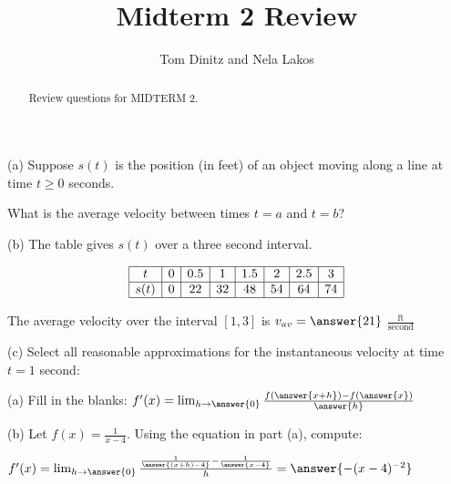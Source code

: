 \documentclass{ximera}
\author{Tom Dinitz and Nela Lakos}
\title{Midterm 2 Review}
\begin{document}
\begin{abstract}
Review questions for MIDTERM 2.
\end{abstract}
\maketitle

\begin{exercise}
(a) Suppose $s(t)$ is the position (in feet) of an object moving along a line at time $t\geq 0$ seconds. 

What is the average velocity between times $t=a$ and $t=b$?
\begin{prompt}
\begin{multipleChoice}
\end{multipleChoice}
\end{prompt}

(b) The table gives $s(t)$ over a three second interval.

\[
\begin{array}{|c|c|c|c|c|c|c|c|}
\hline
t& 0& 0.5& 1& 1.5& 2& 2.5& 3\\ \hline
s(t)& 0 & 22 & 32 & 48 & 54 & 64 & 74 \\ \hline
\end{array}
\]

The average velocity over the interval $[1,3]$ is $v_{av}=\answer{21}$ $\frac{\text{ft}}{\text{second}}$

(c) Select all reasonable approximations for the instantaneous velocity at time $t=1$ second:
\begin{selectAll}
\end{selectAll}
\end{exercise}

\begin{exercise}
(a) Fill in the blanks: $f'(x)=\lim_{h\to\answer{0}}\frac{f(\answer{x+h})-f(\answer{x})}{\answer{h}}$

(b) Let $f(x)=\frac{1}{x-4}$. Using the equation in part (a), compute:

$f'(x)=\lim_{h\to\answer{0}}\frac{\frac{1}{\answer{(x+h)-4}}-\frac{1}{\answer{x-4}}}{h}=\answer{-(x-4)^{-2}}$

\end{exercise}
\end{document}
